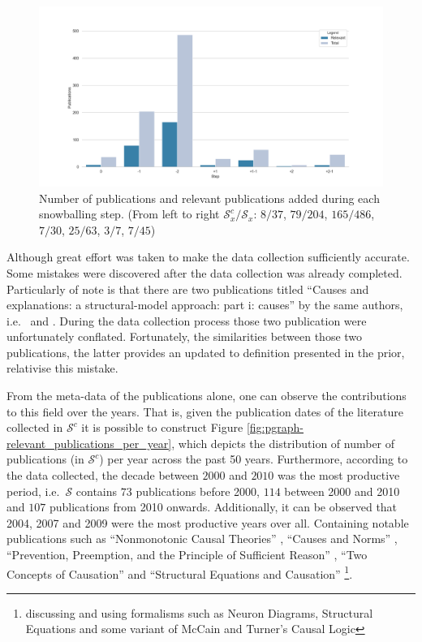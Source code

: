\documentclass[11pt,a4paper]{book}
\theoremstyle{definition}
\theoremstyle{definition}
\theoremstyle{definition}
\theoremstyle{remark}
\newcommand{\xset}{\mathcal{S}}
\begin{document}
\begin{figure}[h!]
\includegraphics[width=\textwidth]{relevant_publications_per_step.png}
\caption{Number of publications and relevant publications added during each snowballing step.
(From left to right $\xset_x^c/\xset_x$: $8/37$, $79/204$, $165/486$, $7/30$, $25/63$, $3/7$, $7/45$)}
\label{fig:pgraph-relevant_publications_per_step}
\end{figure}




Although great effort was taken to make the data collection sufficiently accurate. Some mistakes were discovered after the data collection was already completed.
Particularly of note is that there are two publications titled ``Causes and explanations: a structural-model approach: part i: causes'' by the same authors, i.e.\ \parencite{halpern2001causes} and \parencite{halpern2005causes}.
During the data collection process those two publication were unfortunately conflated. Fortunately, the similarities between those two publications, the latter provides an updated to definition presented in the prior, relativise this mistake.


From the meta-data of the publications alone, one can observe the contributions to this field over the years. That is, given the publication dates of the literature collected in $\xset^c$ it is possible to construct Figure \ref{fig:pgraph-relevant_publications_per_year}, which depicts the distribution of number of publications (in $\xset^c$) per year across the past 50 years.
Furthermore, according to the data collected, the decade between $2000$ and $2010$ was the most productive period, i.e.\ $\xset$ contains $73$ publications before 2000, $114$ between 2000 and 2010 and $107$ publications from 2010 onwards. Additionally, it can be observed that 2004, 2007 and 2009 were the most productive years over all. Containing notable publications such as 
``Nonmonotonic Causal Theories'' \parencite{giunchiglia2004nonmonotonic}, ``Causes and Norms'' \parencite{hitchcock2009cause}, ``Prevention, Preemption, and the Principle of Sufficient Reason'' \parencite{hitchcock2007prevention}, ``Two Concepts of Causation'' \parencite{hall2004two} and ``Structural Equations and Causation'' \parencite{hall2007structural}
\footnote{discussing and using formalisms such as Neuron Diagrams, Structural Equations and some variant of McCain and Turner's Causal Logic}.
\end{document}
